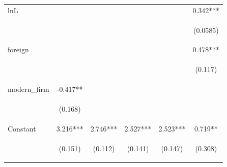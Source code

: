 \begin{center}
\begin{tabular}{lccccc}
lnL &  &  &  &  & 0.342*** \\
\vspace{4pt} & \begin{footnotesize}\end{footnotesize} & \begin{footnotesize}\end{footnotesize} & \begin{footnotesize}\end{footnotesize} & \begin{footnotesize}\end{footnotesize} & \begin{footnotesize}(0.0585)\end{footnotesize} \\
foreign &  &  &  &  & 0.478*** \\
\vspace{4pt} & \begin{footnotesize}\end{footnotesize} & \begin{footnotesize}\end{footnotesize} & \begin{footnotesize}\end{footnotesize} & \begin{footnotesize}\end{footnotesize} & \begin{footnotesize}(0.117)\end{footnotesize} \\
modern\_firm & -0.417** &  &  &  &  \\
\vspace{4pt} & \begin{footnotesize}(0.168)\end{footnotesize} & \begin{footnotesize}\end{footnotesize} & \begin{footnotesize}\end{footnotesize} & \begin{footnotesize}\end{footnotesize} & \begin{footnotesize}\end{footnotesize} \\
Constant & 3.216*** & 2.746*** & 2.527*** & 2.523*** & 0.719** \\
 & \begin{footnotesize}(0.151)\end{footnotesize} & \begin{footnotesize}(0.112)\end{footnotesize} & \begin{footnotesize}(0.141)\end{footnotesize} & \begin{footnotesize}(0.147)\end{footnotesize} & \begin{footnotesize}(0.308)\end{footnotesize} \\

\end{tabular}
\end{center}

